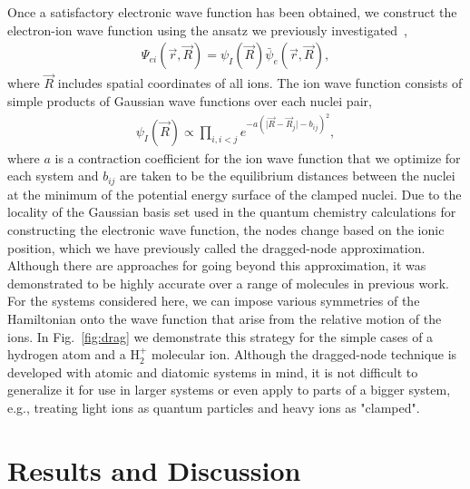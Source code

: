 \documentclass[pra,superscriptaddress,groupedaddress,twocolumn]{revtex4}
\begin{document}
Once a satisfactory electronic wave function has been obtained, we construct the electron-ion wave function using the ansatz we previously investigated~\cite{Tubman_ECG},
\begin{align}
\Psi_{ei}(\vec{r},\vec{R})=\psi_I(\vec{R})\bar{\psi}_e(\vec{r},\vec{R}), \label{eq:psi}
\end{align}
where $\vec{R}$ includes spatial coordinates of all ions. The ion wave function consists of simple products of Gaussian wave functions over each nuclei pair,
\begin{align}
\psi_I(\vec{R})\propto \prod\limits_{i,i<j}e^{-a(\vert \vec{R}-\vec{R}_j\vert-b_{ij})^2},
\label{wfs_ions}
\end{align}
where $a$ is a contraction coefficient for the ion wave function that we optimize for each system and $b_{ij}$ are taken to be the equilibrium distances between the nuclei at the minimum of the potential energy surface of the clamped nuclei.  Due to the locality of the Gaussian basis set used in the quantum chemistry calculations for constructing the electronic wave function, the nodes change based on the ionic position, which we have previously called the dragged-node approximation.  Although there are approaches for going beyond this approximation, it was demonstrated to be highly accurate over a range of molecules in previous work.  For the systems considered here, we can impose various symmetries of the Hamiltonian onto the wave function that arise from the relative motion of the ions.  In Fig.~\ref{fig:drag} we demonstrate this strategy for the simple cases of a hydrogen atom and a H$_2^+$ molecular ion. Although the dragged-node technique is developed with atomic and diatomic systems in mind, it is not difficult to generalize it for use in larger systems or even apply to parts of a bigger system, e.g., treating light ions as quantum particles and heavy ions as "clamped".

\section{Results and Discussion}

\end{document}
